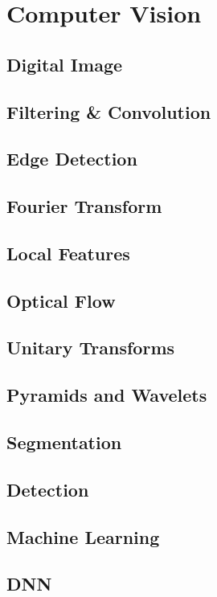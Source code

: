 \section{Computer Vision}
\subsection{Digital Image}


\subsection{Filtering \& Convolution}


\subsection{Edge Detection}


\subsection{Fourier Transform}


\subsection{Local Features}


\subsection{Optical Flow}


\subsection{Unitary Transforms}


\subsection{Pyramids and Wavelets}


\subsection{Segmentation}


\subsection{Detection}


\subsection{Machine Learning}


\subsection{DNN}


% 
